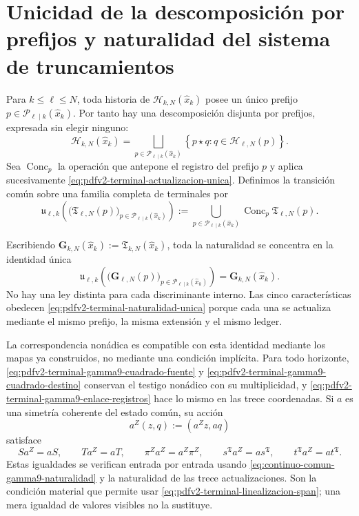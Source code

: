\section{Unicidad de la descomposición por prefijos y naturalidad del sistema de truncamientos}

Para \(k\leq\ell\leq N\), toda historia de
\(\mathscr H_{k,N}(\widehat x_k)\) posee un \'unico prefijo
\(p\in\mathscr P_{\ell\mid k}(\widehat x_k)\). Por tanto hay una descomposici\'on
disjunta por prefijos, expresada sin elegir ninguno:
\begin{equation}
\label{eq:pdfv2-terminal-particion-historias}
 \mathscr H_{k,N}(\widehat x_k)
 =\bigsqcup_{p\in\mathscr P_{\ell\mid k}(\widehat x_k)}
 \left\{p\star q:q\in\mathscr H_{\ell,N}(p)\right\}.
\end{equation}
Sea \(\operatorname{Conc}_p\) la operaci\'on que antepone el registro del
prefijo \(p\) y aplica sucesivamente
\eqref{eq:pdfv2-terminal-actualizacion-unica}. Definimos la transici\'on
com\'un sobre una familia completa de terminales por
\begin{equation}
\label{eq:pdfv2-terminal-transicion-comun}
 \mathfrak u_{\ell,k}
 \left(
   \bigl(\mathfrak T_{\ell,N}(p)\bigr)_{p\in\mathscr P_{\ell\mid k}(\widehat x_k)}
 \right)
 :=\bigcup_{p\in\mathscr P_{\ell\mid k}(\widehat x_k)}
   \operatorname{Conc}_p\mathfrak T_{\ell,N}(p).
\end{equation}

Escribiendo
\(\mathbf G_{k,N}(\widehat x_k):=\mathfrak T_{k,N}(\widehat x_k)\), toda la naturalidad se
concentra en la identidad \'unica
\begin{equation}
\label{eq:pdfv2-terminal-naturalidad-unica}
 \boxed{
 \mathfrak u_{\ell,k}
 \left(
   \bigl(\mathbf G_{\ell,N}(p)\bigr)_{p\in\mathscr P_{\ell\mid k}(\widehat x_k)}
 \right)
 =\mathbf G_{k,N}(\widehat x_k).}
\end{equation}
No hay una ley distinta para cada discriminante interno. Las cinco
caracter\'isticas obedecen
\eqref{eq:pdfv2-terminal-naturalidad-unica} porque cada una se actualiza
mediante el mismo prefijo, la misma extensi\'on y el mismo ledger.

La correspondencia non\'adica es compatible con esta identidad mediante los
mapas ya construidos, no mediante una condici\'on impl\'icita. Para todo
horizonte, \eqref{eq:pdfv2-terminal-gamma9-cuadrado-fuente} y
\eqref{eq:pdfv2-terminal-gamma9-cuadrado-destino} conservan el testigo
non\'adico con su multiplicidad, y
\eqref{eq:pdfv2-terminal-gamma9-enlace-registros} hace lo mismo en las
trece coordenadas. Si \(a\) es una simetr\'ia coherente del estado
com\'un, su acci\'on
\[
 a^Z(z,q):=(a^Zz,aq)
\]
satisface
\begin{equation}
\label{eq:pdfv2-terminal-gamma9-equivarianza-completa}
 S a^Z=aS,\qquad T a^Z=aT,\qquad
 \pi^Za^Z=a^Z\pi^Z,\qquad
 s^{\mathfrak T}a^Z=as^{\mathfrak T},\qquad
 t^{\mathfrak T}a^Z=at^{\mathfrak T}.
\end{equation}
Estas igualdades se verifican entrada por entrada usando
\eqref{eq:continuo-comun-gamma9-naturalidad} y la naturalidad de las trece
actualizaciones. Son la condici\'on material que permite usar
\eqref{eq:pdfv2-terminal-linealizacion-span}; una mera igualdad de valores
visibles no la sustituye.

